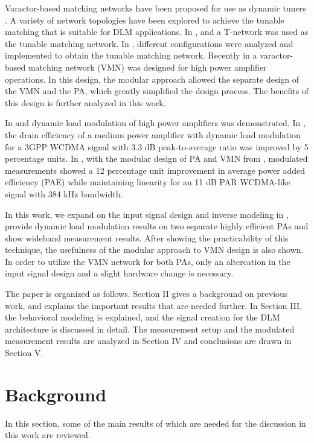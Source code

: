 \documentclass[10pt,journal]{IEEEtran}
\begin{document}
Varactor-based matching networks have been proposed for use as dynamic tuners \cite{neo,buisman}. A variety of network topologies have been explored to achieve the tunable matching that is suitable for DLM applications. In \cite{raab}, \cite{fuMTT} and \cite{fu1} a T-network was used as the tunable matching network. In \cite{neo}, different configurations were analyzed and implemented to obtain the tunable matching network. Recently in \cite{hosseinMTT} a varactor-based matching network (VMN) was designed for high power amplifier operations. In this design, the modular approach allowed the separate design of the VMN and the PA, which greatly simplified the design process. The benefits of this design is further analyzed in this work.

In \cite{fuMTT} and \cite{soltani} dynamic load modulation of high power amplifiers was demonstrated. In \cite{fuMTT}, the drain efficiency of a medium power amplifier with dynamic load modulation for a 3GPP WCDMA signal with 3.3 dB peak-to-average ratio was improved by 5 percentage units. In \cite{soltani}, with the modular design of PA and VMN from \cite{hosseinMTT}, modulated measurements showed a 12 percentage unit improvement in average power added efficiency (PAE) while maintaining linearity for an 11 dB PAR WCDMA-like signal with 384 kHz bandwidth.

In this work, we expand on the input signal design and inverse modeling in \cite{soltani}, provide dynamic load modulation results on two separate highly efficient PAs and show wideband measurement results. After showing the practicability of this technique, the usefulness of the modular approach to VMN design is also shown. In order to utilize the VMN network for both PAs, only an altercation in the input signal design and a slight hardware change is necessary.

The paper is organized as follows. Section II gives a background on previous work, and explains the important results that are needed further. In Section III, the behavioral modeling is explained, and the signal creation for the DLM architecture is discussed in detail. The measurement setup and the modulated measurement results are analyzed in Section IV and conclusions are drawn in Section V.


\section{Background}
In this section, some of the main results of \cite{hosseinMTT,soltani,hosseinEMW} which are needed for the discussion in this work are reviewed.
\end{document}
